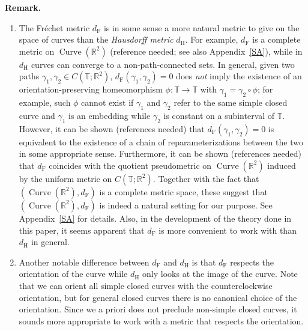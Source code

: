 \documentclass[reqno,centertags,12pt]{amsart}
\theoremstyle{definition}
\numberwithin{equation}{section}
\newcommand{\bbR}{{\mathbb{R}}}
\newcommand{\bbT}{{\mathbb{T}}}
\begin{document}
\textbf{Remark.} \begin{enumerate}
    \item The Fr\'{e}chet metric $d_{\mathrm{F}}$ is in some sense a more natural
    metric to give on the space of curves than the \emph{Hausdorff metric} $d_{\mathrm{H}}$.
    For example, $d_{\mathrm{F}}$ is a complete metric on
    $\operatorname{Curve}(\bbR^{2})$ (reference needed; see also
    Appendix~\ref{SA}), while in $d_{\mathrm{H}}$ curves can converge
    to a non-path-connected sets. In general, given two paths
    $\gamma_{1},\gamma_{2}\in C(\bbT;\bbR^{2})$, $d_{\mathrm{F}}(\gamma_{1},\gamma_{2}) = 0$
    does \emph{not} imply the existence of an orientation-preserving homeomorphism
    $\phi\colon\bbT\to \bbT$ with $\gamma_{1} = \gamma_{2}\circ\phi$; for example,
    such $\phi$ cannot exist if $\gamma_{1}$ and $\gamma_{2}$ refer to the same simple
    closed curve and $\gamma_{1}$ is an embedding while $\gamma_{2}$ is constant on a
    subinterval of $\bbT$. However, it can be shown (references needed) that
    $d_{\mathrm{F}}(\gamma_{1},\gamma_{2}) = 0$ is equivalent to the existence of
    a chain of reparameterizations between the two in some appropriate sense.
    Furthermore, it can be shown (references needed) that $d_{\mathrm{F}}$ coincides
    with the quotient pseudometric on $\operatorname{Curve}(\bbR^{2})$ induced by
    the uniform metric on $C(\bbT;\bbR^{2})$. Together with the fact that
    $(\operatorname{Curve}(\bbR^{2}),d_{\mathrm{F}})$ is a complete metric space,
    these suggest that $(\operatorname{Curve}(\bbR^{2}),d_{\mathrm{F}})$ is indeed
    a natural setting for our purpose. See Appendix~\ref{SA} for details.
    Also, in the development of the theory done in this paper,
    it seems apparent that $d_{\mathrm{F}}$ is more convenient to work with than
    $d_{\mathrm{H}}$ in general.
    
    \item Another notable difference between $d_{\mathrm{F}}$ and $d_{\mathrm{H}}$ is that
    $d_{\mathrm{F}}$ respects the orientation of the curve while $d_{\mathrm{H}}$ only
    looks at the image of the curve. Note that we can orient all simple closed curves
    with the counterclockwise orientation, but for general closed curves there is no
    canonical choice of the orientation. Since we a priori does not preclude non-simple
    closed curves, it sounds more appropriate to work with a metric that respects
    the orientation.
    

\end{enumerate}
\end{document}

